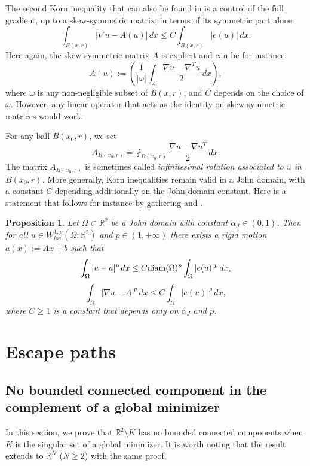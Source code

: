 \documentclass[12pt]{article}
\newtheorem{proposition}[theorem]{Proposition}
\theoremstyle{definition}
\theoremstyle{remark}
\numberwithin{equation}{section}
\def\Xint#1{\mathchoice
    {\XXint\displaystyle\textstyle{#1}}
    {\XXint\textstyle\scriptstyle{#1}}
    {\XXint\scriptstyle\scriptscriptstyle{#1}}
    {\XXint\scriptscriptstyle\scriptscriptstyle{#1}}
\!\int}
\def\XXint#1#2#3{{\setbox0=\hbox{$#1{#2#3}{\int}$}
\vcenter{\hbox{$#2#3$}}\kern-.5\wd0}}
\def\dashint{\Xint-}
\newcommand{\R}{\mathbb{R}}
\newcommand{\D}{\nabla}
\begin{document}
The second Korn inequality that can also be found in \cite{korn} is a control of the full gradient, up to a skew-symmetric matrix, in terms of its symmetric part alone: 
\begin{equation}
    \int_{B(x,r)} |\nabla u-A(u)| \,dx \leq C \int_{B(x,r)} |e(u)| \,dx. \label{Korn2}
\end{equation}
Here again, the skew-symmetric matrix $A$ is explicit and can be for instance 
\[A(u):=\left(\frac{1}{|\omega|}\int_{\omega} \frac{\nabla u - \nabla^T u}{2} \,dx\right),\]
where $\omega$ is any non-negligible subset of $B(x,r)$, and $C$ depends on the choice of $\omega$.
However, any linear operator that acts as the identity on skew-symmetric matrices would work.

For any ball $B(x_0,r)$, we set
\begin{equation}
    A_{B(x_0,r)}=\fint_{B(x_0,r)}\frac{\D u-\D u^T}{2}\,dx.
\end{equation}
The matrix $A_{B(x_0,r)}$ is sometimes called \emph{infinitesimal rotation associated to $u$ in $B(x_0,r)$.}
More generally, Korn inequalities remain valid in a John domain, with a constant $C$ depending additionally on the John-domain constant.
Here is a statement that follows for instance by gathering \cite[Theorem 1.5]{korn1} and \cite[Theorem 8]{korn2}.

\begin{proposition}\label{kornJohn}
    Let $\Omega \subset \R^2$ be a  John domain with constant $\alpha_J\in (0,1)$. Then for all $u\in W^{1,p}_{loc}(\Omega;\R^2)$
    and $p\in (1,+\infty)$ there exists a rigid motion $a(x):=Ax+b$ such that 
    \[\int_{\Omega} |u-a|^p\,dx \leq C {\rm diam}(\Omega)^p \int_{\Omega} |e(u)|^p \,dx,\]
    \[\int_{\Omega} |\nabla u -A|^p\,dx \leq C \int_{\Omega} |e(u)|^p \,dx,\]
    where $C \geq 1$ is a constant that depends only on $\alpha_J$ and $p$. 
\end{proposition}

\section{Escape paths}

\subsection{No bounded connected component in the complement of a global minimizer}

In this section, we prove that $\R^2\setminus K$ has no bounded connected components when $K$ is the singular set of
a global minimizer. It is worth noting that the result extends to $\R^N$ ($N\geq 2$) with the same proof. 
\end{document}
